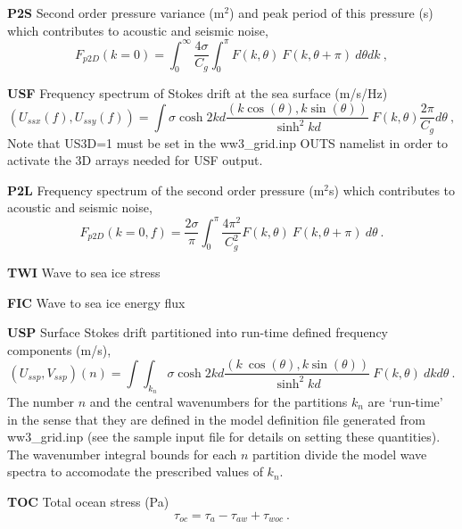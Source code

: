 \begin{list}{)\hfill}
\begin{list}{)\hfill}
\item \textbf{P2S} Second order pressure variance (m$^2$) and peak period of this pressure (s) which contributes to acoustic and seismic noise, 
      \begin{equation} F_{p2D}(k=0) = \int_0^{\infty} \frac{4 \sigma}{C_g} \int_0^{\pi}  F(k,\theta) \:  F(k,\theta+\pi) \:  d\theta dk
      \: , \label{eq:sop} \end{equation}
\item \textbf{USF} Frequency spectrum of Stokes drift at the sea surface (m/s/Hz)
     \begin{equation} (U_{ssx}(f),U_{ssy}(f)) =  \int \sigma \cosh 2kd \frac{(k \cos(\theta),k \sin(\theta))}
        {\sinh^2 kd}  \: F(k,\theta) \frac{2 \pi}{C_g} d\theta
      \: , \label{eq:Ussf} \end{equation}
Note that US3D=1 must be set in the ww3\_grid.inp OUTS namelist in order to activate the 3D arrays needed for USF output.
\item \textbf{P2L} Frequency spectrum of the second order pressure (m$^2$s)  which contributes to acoustic and seismic noise,
      \begin{equation} F_{p2D}(k=0,f) =  \frac{2 \sigma}{\pi} \int_0^{\pi}  \frac{4 \pi^2}{C_g^2} F(k,\theta) \:  F(k,\theta+\pi) \:  d\theta
      \: . \label{eq:sopf} \end{equation}
\item \textbf{TWI}   Wave to sea ice stress
\item \textbf{FIC}   Wave to sea ice energy flux
\item \textbf{USP}   Surface Stokes drift partitioned into run-time defined frequency components (m/s),
      \begin{equation} (U_{ssp},V_{ssp})(n) =  \int \!\!\!\! \int_{k_n}  \sigma \cosh 2kd \frac{(k\
      \cos(\theta),k \sin(\theta))}
        {\sinh^2 kd}  \: F(k,\theta) \: dk d\theta
      \: . \label{eq:Ussp} \end{equation}
The number $n$ and the central wavenumbers for the partitions $k_n$ are `run-time' in the sense that they are defined in the model definition file generated from ww3\_grid.inp (see the sample input file for details on setting these quantities).  The wavenumber integral bounds for each $n$ partition divide the model wave spectra to accomodate the prescribed values of $k_n$.
\item \textbf{TOC} Total ocean stress (Pa)
      \begin{equation} \tau_{oc} = \tau_a - \tau_{aw} + \tau_{woc}
      \: . \label{eq:Toc} \end{equation}
\end{list}


\end{list}
